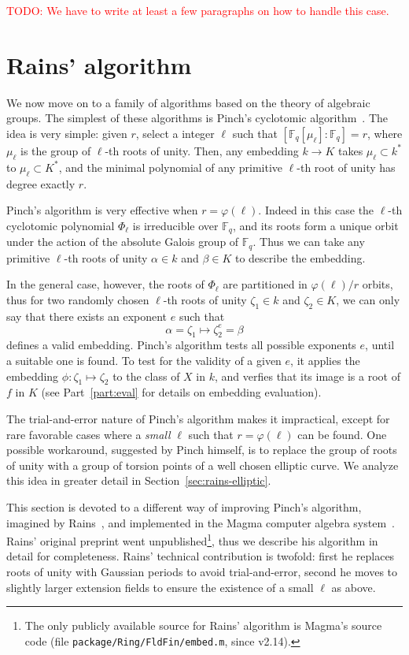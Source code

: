 \documentclass[12pt]{article}
\theoremstyle{plain}
\theoremstyle{definition}
\newcommand{\todo}[1]{\textcolor{red}{TODO: #1}}
\def\F{\ensuremath{\mathbb{F}}}
\def\euler{\ensuremath{\varphi}}
\newcounter{algorithm}
\begin{document}
\todo{We have to write at least a few paragraphs on how to handle this case.}


\section{Rains' algorithm}

We now move on to a family of algorithms based on the theory of
algebraic groups. The simplest of these algorithms is Pinch's
cyclotomic algorithm~\cite{Pinch}. The idea is very simple: given $r$,
select a integer $\ell$ such that $[\F_q[\mu_\ell]:\F_q]=r$, where
$\mu_\ell$ is the group of $\ell$-th roots of unity.  Then, any
embedding $k\to K$ takes $\mu_\ell\subset k^\ast$ to $\mu_\ell\subset
K^\ast$, and the minimal polynomial of any primitive $\ell$-th root of
unity has degree exactly $r$.

Pinch's algorithm is very effective when $r=\euler(\ell)$. Indeed in
this case the $\ell$-th cyclotomic polynomial $\Phi_\ell$ is
irreducible over $\F_q$, and its roots form a unique orbit under the
action of the absolute Galois group of $\F_q$. Thus we can take any
primitive $\ell$-th roots of unity $\alpha\in k$ and $\beta\in K$ to
describe the embedding.

In the general case, however, the roots of $\Phi_\ell$ are partitioned
in $\euler(\ell)/r$ orbits, thus for two randomly chosen $\ell$-th
roots of unity $\zeta_1\in k$ and $\zeta_2\in K$, we can only say that
there exists an exponent $e$ such that
\begin{equation*}
  \alpha = \zeta_1 \mapsto \zeta_2^e = \beta
\end{equation*}
defines a valid embedding. Pinch's algorithm tests all possible
exponents $e$, until a suitable one is found. To test for the validity
of a given $e$, it applies the embedding $\phi:\zeta_1\mapsto\zeta_2$
to the class of $X$ in $k$, and verfies that its image is a root of
$f$ in $K$ (see Part~\ref{part:eval} for details on embedding
evaluation).

The trial-and-error nature of Pinch's algorithm makes it impractical,
except for rare favorable cases where a \emph{small} $\ell$ such that
$r=\euler(\ell)$ can be found. One possible workaround, suggested by
Pinch himself, is to replace the group of roots of unity with a group
of torsion points of a well chosen elliptic curve. We analyze this
idea in greater detail in Section~\ref{sec:rains-elliptic}.

This section is devoted to a different way of improving Pinch's
algorithm, imagined by Rains~\cite{rains2008}, and implemented in the
Magma computer algebra system~\cite{MAGMA}. Rains' original preprint
went unpublished\footnote{The only publicly available source for
  Rains' algorithm is Magma's source code (file
  \texttt{package/Ring/FldFin/embed.m}, since v2.14).}, thus we
describe his algorithm in detail for completeness. Rains' technical
contribution is twofold: first he replaces roots of unity with
Gaussian periods to avoid trial-and-error, second he moves to slightly
larger extension fields to ensure the existence of a small $\ell$ as
above.
\end{document}
